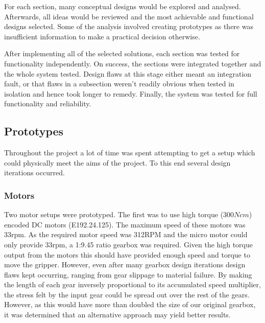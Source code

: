 \documentclass[conference]{IEEEtran}
\begin{document}
For each section, many conceptual designs would be explored and analysed. Afterwards, all ideas would be reviewed and the most achievable and functional designs selected. Some of the analysis involved creating prototypes as there was insufficient information to make a practical decision otherwise.

After implementing all of the selected solutions, each section was tested for functionality independently. On success, the sections were integrated together and the whole system tested. Design flaws at this stage either meant an integration fault, or that flaws in a subsection weren't readily obvious when tested in isolation and hence took longer to remedy. Finally, the system was tested for full functionality and reliability.


\subsection{Prototypes}\label{prototypes}
Throughout the project a lot of time was spent attempting to get a setup which could physically meet the aims of the project. To this end several design iterations occurred.

\subsubsection{Motors}
Two motor setups were prototyped. The first was to use high torque ($300Ncm$) encoded DC motors (E192.24.125). The maximum speed of these motors was 33rpm. As the required motor speed was 312RPM and the micro motor could only provide 33rpm, a 1:9.45 ratio gearbox was required.    Given the high torque output from the motors this should have provided enough speed and torque to move the gripper. However, even after many gearbox design iterations design flaws kept occurring, ranging from gear slippage to material failure. By making the length of each gear inversely proportional to its accumulated speed multiplier, the stress felt by the input gear could be spread out over the rest of the gears. However, as this would have more than doubled the size of our original gearbox, it was determined that an alternative approach may yield better results.
\end{document}
